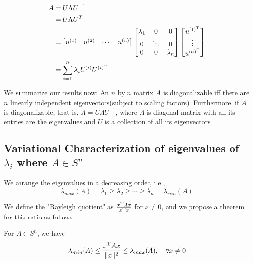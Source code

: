 \begin{align*}
A &= U\Lambda U^{-1}\\
&= U\Lambda U^{T}\\
&= 
\begin{bmatrix}
u^{(1)} & u^{(2)} & \cdots & u^{(n)}\\
\end{bmatrix}
\begin{bmatrix}
\lambda_1 & 0 & 0\\
0 & \ddots & 0\\
0 & 0 & \lambda_n
\end{bmatrix}
\begin{bmatrix}
u^{(1)^{{\rm T}}}\\
\vdots\\
u^{(n)^{{\rm T}}}
\end{bmatrix}\\
&= \sum^n_{i=1}\lambda_iU^{(i)}U^{(i)^{{\rm T}}}
\end{align*}

We summarize our results now: An $n$ by $n$ matrix $A$ is diagonalizable iff there are $n$ linearly independent eigenvectors(subject to scaling factors). Furthermore, if $A$ is diagonalizable, that is, $A = U\Lambda U^{-1}$, where $\Lambda$ is diagonal matrix with all its entries are the eigenvalues and $U$ is a collection of all its eigenvectors. 

\subsection{Variational Characterization of eigenvalues of $\lambda_i$ where $A\in S^n$} 

We arrange the eigenvalues in a decreasing order, i.e., 
$$\lambda_{max}(A) = \lambda_1 \geq \lambda_2 \geq \cdots \geq \lambda_n =\lambda_{min}(A)$$


We define the "Rayleigh quotient" as $\frac{x^{{\rm T}}Ax}{x^{{\rm T}}x}$ for $x\neq 0$, and we propose a theorem for this ratio as follows

\begin{theorem}
For $A\in S^n$, we have 
$$\lambda_{min}(A) \leq \frac{x^{{\rm T}}Ax}{\Vert x\Vert^2}\leq \lambda_{max}(A),\quad \forall x \neq 0$$
\end{theorem}


